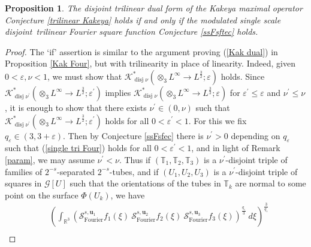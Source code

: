 \documentclass{amsart}%
\theoremstyle{plain}
\newtheorem{proposition}[theorem]{Proposition}
\numberwithin{equation}{section}
\begin{document}
\begin{proposition}
\label{Kak tri equiv}The disjoint trilinear dual form of the Kakeya maximal
operator Conjecture \ref{trilinear Kakeya} holds \emph{if and only if} the
modulated single scale disjoint\emph{\ }trilinear Fourier square function
Conjecture \ref{ssFsftec} holds.
\end{proposition}

\begin{proof}
The `if' assertion is similar to the argument proving (\ref{Kak dual}) in
Proposition \ref{Kak Four}, but with trilinearity in place of linearity.
Indeed, given $0<\varepsilon,\nu<1$, we must show that $\mathcal{K}%
_{\operatorname*{disj}\nu}^{\ast}\left(  \otimes_{3}L^{\infty}\rightarrow
L^{\frac{3}{2}};\varepsilon\right)  $ holds. Since $\mathcal{K}%
_{\operatorname*{disj}\nu^{\prime}}^{\ast}\left(  \otimes_{3}L^{\infty
}\rightarrow L^{\frac{3}{2}};\varepsilon^{\prime}\right)  $ implies
$\mathcal{K}_{\operatorname*{disj}\nu}^{\ast}\left(  \otimes_{3}L^{\infty
}\rightarrow L^{\frac{3}{2}};\varepsilon\right)  $ for $\varepsilon^{\prime
}\leq\varepsilon$ and $\nu^{\prime}\leq\nu$, it is enough to show that there
exists $\nu^{\prime}\in\left(  0,\nu\right)  $ such that $\mathcal{K}%
_{\operatorname*{disj}\nu^{\prime}}^{\ast}\left(  \otimes_{3}L^{\infty
}\rightarrow L^{\frac{3}{2}};\varepsilon^{\prime}\right)  $ holds for all
$0<\varepsilon^{\prime}<1 $. For this we fix $q_{\varepsilon}\in\left(
3,3+\varepsilon\right)  $. Then by Conjecture \ref{ssFsfec} there is
$\nu^{\prime}>0$ depending on $q_{\varepsilon}$ such that
(\ref{single tri Four}) holds for all $0<\varepsilon^{\prime}<1$, and in light
of Remark \ref{param}, we may assume $\nu^{\prime}<\nu$. Thus if $\left(
\mathbb{T}_{1},\mathbb{T}_{2},\mathbb{T}_{3}\right)  $ is a $\nu^{\prime}%
$-disjoint triple of families of $2^{-s}$-separated $2^{-s}$-tubes, and if
$\left(  U_{1},U_{2},U_{3}\right)  $ is a $\nu^{\prime}$-disjoint triple of
squares in $\mathcal{G}\left[  U\right]  $ such that the orientations of the
tubes in $\mathbb{T}_{k}$ are normal to some point on the surface $\Phi\left(
U_{k}\right)  $, we have%
\begin{align*}
&  \left(  \int_{\mathbb{R}^{3}}\left(  \mathcal{S}_{\operatorname*{Fourier}%
}^{s,\mathbf{u}_{1}}f_{1}\left(  \xi\right)  \ \mathcal{S}%
_{\operatorname*{Fourier}}^{s,\mathbf{u}_{2}}f_{2}\left(  \xi\right)
\ \mathcal{S}_{\operatorname*{Fourier}}^{s,\mathbf{u}_{3}}f_{3}\left(
\xi\right)  \right)  ^{\frac{q_{\varepsilon}}{3}}\ d\xi\right)  ^{\frac
{3}{q_{\varepsilon}}}\\

\end{align*}
\end{proof}
\end{document}
